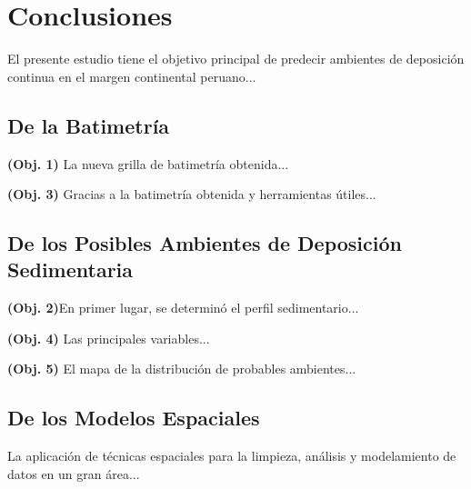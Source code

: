 \chapter{Conclusiones}
\thispagestyle{empty}
El presente estudio tiene el objetivo principal de predecir ambientes de deposición continua en el margen continental peruano...
\section{De la Batimetría}

\textbf{(Obj. 1)} La nueva grilla de batimetría obtenida...

\textbf{(Obj. 3)} Gracias a la batimetría obtenida y herramientas útiles...
 
\section{De los Posibles Ambientes de Deposición Sedimentaria}

\textbf{(Obj. 2)}En primer lugar, se determinó el perfil sedimentario...

\textbf{(Obj. 4)} Las principales variables...

\textbf{(Obj. 5)} El mapa de la distribución de probables ambientes...

\section{De los Modelos Espaciales}

La aplicación de técnicas espaciales para la limpieza, análisis y modelamiento de datos en un gran área...
